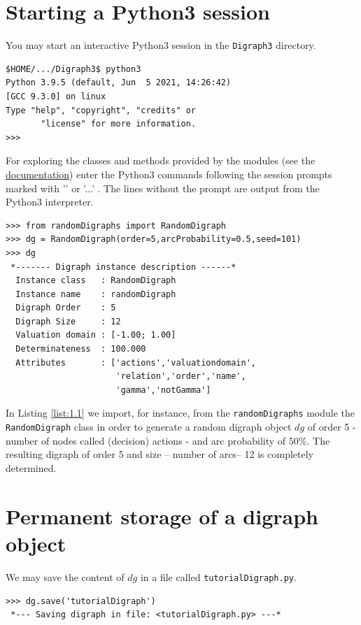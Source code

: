 \section{Starting a Python3 session}
\label{sec:1.2}
You may start an interactive Python3 session in the \texttt{Digraph3} directory.
\begin{footnotesize}
\begin{verbatim}
$HOME/.../Digraph3$ python3
Python 3.9.5 (default, Jun  5 2021, 14:26:42)
[GCC 9.3.0] on linux
Type "help", "copyright", "credits" or
       "license" for more information.
>>>
\end{verbatim}
\end{footnotesize}
For exploring the classes and methods provided by the \Digraph modules (see the \href{https://digraph3.readthedocs.io/en/latest/}{\Digraph documentation}) enter the Python3 commands following the session prompts marked with '\>\>\>' or '...' . The lines without the prompt are output from the Python3 interpreter.

\begin{lstlisting}[caption={Generating a digraph instance},label=list:1.1]
>>> from randomDigraphs import RandomDigraph
>>> dg = RandomDigraph(order=5,arcProbability=0.5,seed=101)
>>> dg
 *------- Digraph instance description ------*
  Instance class   : RandomDigraph
  Instance name    : randomDigraph
  Digraph Order    : 5
  Digraph Size     : 12
  Valuation domain : [-1.00; 1.00]
  Determinateness  : 100.000
  Attributes       : ['actions','valuationdomain',
                      'relation','order','name',
                      'gamma','notGamma']
\end{lstlisting}
                   
In Listing \ref{list:1.1}  we import, for instance, from the \texttt{randomDigraphs} module the \texttt{RandomDigraph} class in order to generate a random digraph object $dg$ of order 5 - number of nodes called (decision) actions - and arc probability of $50\%$. The resulting digraph of order 5 and size -- number of arcs-- 12 is completely determined.

\section{Permanent storage of a digraph object}
\label{sec:1.3}                   
We may save the content of $dg$ in a file called \texttt{tutorialDigraph.py}.

\begin{lstlisting}
>>> dg.save('tutorialDigraph')
 *--- Saving digraph in file: <tutorialDigraph.py> ---*
\end{lstlisting}

